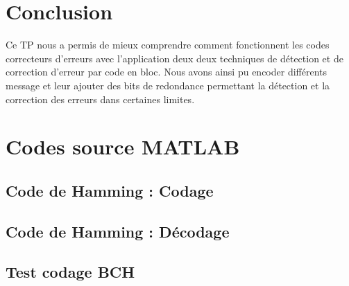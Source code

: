 \documentclass[a4paper, 12pt]{article}
\newcommand{\FSource}[1]{%

}
\begin{document}
\newpage

\section{Conclusion}
Ce TP nous a permis de mieux comprendre comment fonctionnent les codes correcteurs d'erreurs avec l'application deux deux techniques de détection et de correction d'erreur par code en bloc. Nous avons ainsi pu encoder différents message et leur ajouter des bits de redondance permettant la détection et la correction des erreurs dans certaines limites.
\clearpage

%
%
\appendix

\section{Codes source MATLAB}

\subsection{Code de Hamming : Codage}\label{hamcode}

\FSource{../hamcode.m}

\newpage

\subsection{Code de Hamming : Décodage}\label{hamdecode}

\FSource{../hamdecode.m}

\newpage

\subsection{Test codage BCH}\label{bchtest}

\FSource{../bchtest.m}
\end{document}
